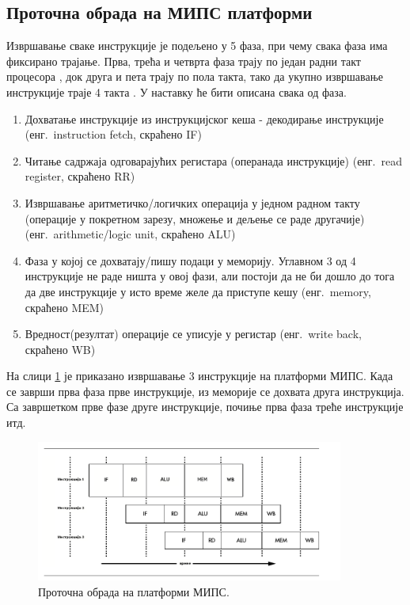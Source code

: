 \documentclass[12pt,oneside]{memoir}
\begin{document}
\subsection{Проточна обрада на МИПС платформи}

Извршавање сваке инструкције је подељено у 5 фаза, при чему свака фаза има фиксирано трајање. Прва, трећа и четврта фаза трају по један радни такт процесора , док друга и пета трају по пола такта, тако да укупно извршавање инструкције траје 4 такта \cite{mips}. У наставку ће бити описана свака од фаза.

\begin{enumerate}
\item Дохватање инструкције из инструкцијског кеша - декодирање инструкције (енг.~instruction fetch, скраћено IF)
\item Читање садржаја одговарајућих регистара (операнада инструкције) (енг.~read register, скраћено RR)
\item Извршавање аритметичко/логичких операција у једном радном такту (операције у покретном зарезу, множење и дељење се раде другачије) (енг.~arithmetic/logic unit, скраћено ALU)
\item  Фаза у којој се дохватају/пишу подаци у меморију. Углавном 3 од 4 инструкције не раде ништа у овој фази, али постоји да не би дошло до тога да две инструкције у исто време желе да приступе кешу (енг.~memory, скраћено MEM)
\item Вредност(резултат) операције се уписује у регистар (енг.~write back, скраћено WB)
\end{enumerate}

На слици \ref{fig:pipeline} је приказано извршавање 3 инструкције на платформи МИПС. Када се заврши прва фаза прве инструкције, из меморије се дохвата друга инструкција. Са завршетком прве фазе друге инструкције, почиње прва фаза треће инструкције итд. 

\begin{figure}[!ht]
  \centering
  \includegraphics[width=0.9\textwidth]{pipeline.png}
  \caption{Проточна обрада на платформи МИПС.}
  \label{fig:pipeline}
\end{figure}
\end{document}

